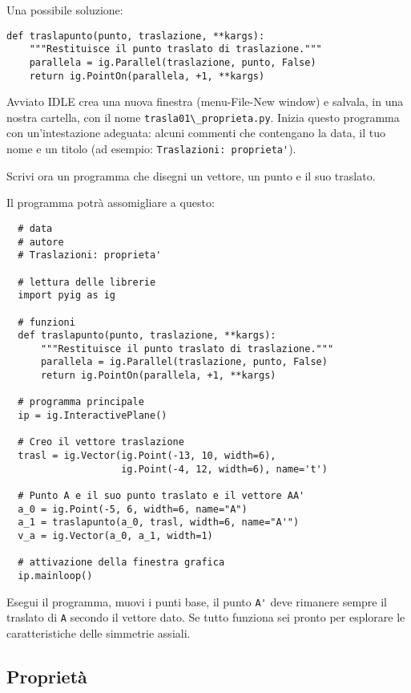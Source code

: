 Una possibile soluzione:

\begin{lstlisting}
def traslapunto(punto, traslazione, **kargs):
    """Restituisce il punto traslato di traslazione."""
    parallela = ig.Parallel(traslazione, punto, False)
    return ig.PointOn(parallela, +1, **kargs)
\end{lstlisting}

Avviato IDLE crea una nuova finestra (menu-File-New window) e 
salvala, in una nostra cartella, con il nome 
\lstinline{trasla01\_proprieta.py}.
Inizia questo programma
con un'intestazione adeguata: alcuni commenti che contengano la data, il
tuo nome e un titolo (ad esempio: \lstinline{Traslazioni: proprieta'}).

Scrivi ora un programma che disegni un vettore, un punto e il
suo traslato.

Il programma potrà assomigliare a questo:

\begin{lstlisting}
  # data
  # autore
  # Traslazioni: proprieta'

  # lettura delle librerie
  import pyig as ig

  # funzioni
  def traslapunto(punto, traslazione, **kargs):
      """Restituisce il punto traslato di traslazione."""
      parallela = ig.Parallel(traslazione, punto, False)
      return ig.PointOn(parallela, +1, **kargs)

  # programma principale
  ip = ig.InteractivePlane()

  # Creo il vettore traslazione
  trasl = ig.Vector(ig.Point(-13, 10, width=6),
                    ig.Point(-4, 12, width=6), name='t')

  # Punto A e il suo punto traslato e il vettore AA'
  a_0 = ig.Point(-5, 6, width=6, name="A")
  a_1 = traslapunto(a_0, trasl, width=6, name="A'")
  v_a = ig.Vector(a_0, a_1, width=1)
  
  # attivazione della finestra grafica
  ip.mainloop()
\end{lstlisting}

Esegui il programma, muovi i punti base, il punto \lstinline{A'} deve 
rimanere
sempre il traslato di \lstinline{A} secondo il vettore dato.
Se tutto funziona sei pronto per esplorare le caratteristiche delle
simmetrie assiali.


\subsection{Proprietà}

